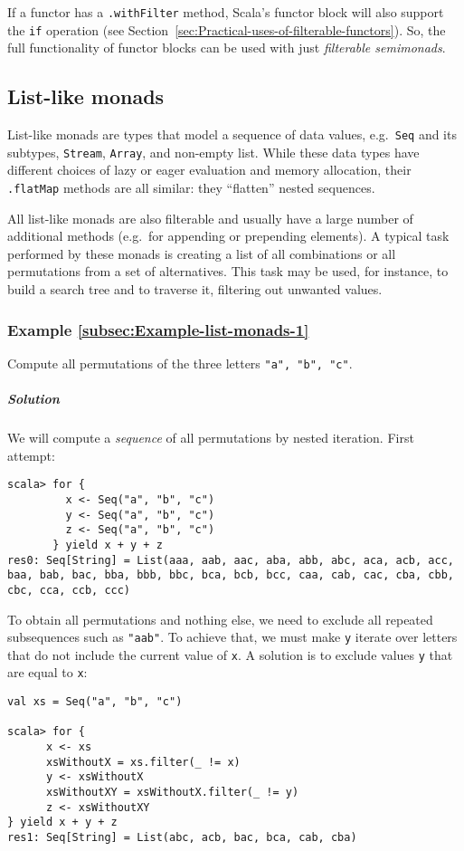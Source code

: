 If a functor has a \lstinline!.withFilter! method, Scala's functor
block will also support the \lstinline!if! operation (see Section~\ref{sec:Practical-uses-of-filterable-functors}).
So, the full functionality of functor blocks can be used with just
\emph{filterable semimonads}.

\subsection{List-like monads}

List-like monads are types that model a sequence of data values, e.g.~\lstinline!Seq!
and its subtypes, \lstinline!Stream!, \lstinline!Array!, and non-empty
list. While these data types have different choices of lazy or eager
evaluation and memory allocation, their \lstinline!.flatMap! methods
are all similar: they ``flatten'' nested sequences.

All list-like monads are also filterable and usually have a large
number of additional methods (e.g.~for appending or prepending elements).
A typical task performed by these monads is creating a list of all
combinations or all permutations from a set of alternatives. This
task may be used, for instance, to build a search tree and to traverse
it, filtering out unwanted values.

\subsubsection{Example \label{subsec:Example-list-monads-1}\ref{subsec:Example-list-monads-1}}

Compute all permutations of the three letters \lstinline!"a", "b", "c"!. 

\subparagraph{Solution}

We will compute a \emph{sequence} of all permutations by nested iteration.
First attempt:
\begin{lstlisting}
scala> for {
         x <- Seq("a", "b", "c")
         y <- Seq("a", "b", "c")
         z <- Seq("a", "b", "c")
       } yield x + y + z
res0: Seq[String] = List(aaa, aab, aac, aba, abb, abc, aca, acb, acc, baa, bab, bac, bba, bbb, bbc, bca, bcb, bcc, caa, cab, cac, cba, cbb, cbc, cca, ccb, ccc)
\end{lstlisting}
To obtain all permutations and nothing else, we need to exclude all
repeated subsequences such as \lstinline!"aab"!. To achieve that,
we must make \lstinline!y! iterate over letters that do not include
the current value of \lstinline!x!. A solution is to exclude values
\lstinline!y! that are equal to \lstinline!x!:
\begin{lstlisting}
val xs = Seq("a", "b", "c")

scala> for {
      x <- xs
      xsWithoutX = xs.filter(_ != x)
      y <- xsWithoutX
      xsWithoutXY = xsWithoutX.filter(_ != y)
      z <- xsWithoutXY
} yield x + y + z
res1: Seq[String] = List(abc, acb, bac, bca, cab, cba) 
\end{lstlisting}


